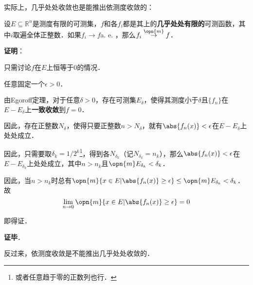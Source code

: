 实际上，几乎处处收敛也是能推出依测度收敛的：

\begin{theorem}{}\label{LimMs_the1}

设$E\subseteq \mathbb{R}^n$是测度有限的可测集，$f$和各$f_i$都是其上的\textbf{几乎处处有限的}可测函数，其中$i$取遍全体正整数．如果$f_i\to f $a. e. ，那么$f_i\overset{\opn{m}}\to f$．



\end{theorem}

\textbf{证明}：

只需讨论$f$在$E$上恒等于$0$的情况．

任意固定一个$\epsilon>0$．

由Egoroff定理，对于任意$\delta>0$，存在可测集$E_\delta$，使得其测度小于$\delta$且$\{f_n\}$在$E-E_\delta$上\textbf{一致收敛}到$f=0$．

因此，存在正整数$N_\delta$，使得只要正整数$n>N_\delta$，就有$\abs{f_n(x)}<\epsilon$在$E-E_\delta$上处处成立．

因此，只需要取$\delta_k=1/2^k$\footnote{或者任意趋于零的正数列也行．}，得到各$N_{\delta_k}$（记$N_{\delta_k}=n_k$），那么$\abs{f_{n}(x)}<\epsilon$在$E-E_{\delta_k}$上处处成立，其中$n>n_k$且$\opn{m}E_{\delta_k}<{\delta_k}$．

因此，当$n>n_k$时总有$\opn{m}\{x\in E|\abs{f_n(x)}\geq\epsilon\}\leq\opn{m}E_{\delta_k}<\delta_k$．故
\begin{equation}
\lim\limits_{n\to 0}\opn{m}\{x\in E|\abs{f_n(x)}\geq\epsilon\}=0
\end{equation}

即得证．

\textbf{证毕}．


反过来，依测度收敛是不能推出几乎处处收敛的．

